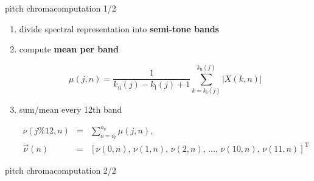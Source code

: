         \begin{frame}{pitch chroma}{computation 1/2}
            \begin{enumerate}
                \item	divide spectral representation into \textbf{semi-tone bands}
                \item<2->	compute \textbf{mean per band}
                    \begin{footnotesize}
                        \begin{equation*}
                            \mu(j,n)		= \frac{1}{k_{\mathrm{u}}(j)-k_{\mathrm{l}}(j)+1}\sum\limits_{k=k_{\mathrm{l}}(j)}^{k_{\mathrm{u}}(j)}{|X(k,n)|}
                        \end{equation*}
                    \end{footnotesize}
                \item<3->	sum/mean every 12th band
                    \begin{footnotesize}
                        \begin{eqnarray*}
                            \nu(j\% 12 ,n)		&=& \sum\limits_{o=o_l}^{o_u}{\mu(j,n)}\label{eq:pc}, \\
                            \vec{\nu}(n) 	&=& \left[\nu(0,n),\, \nu(1,n),\, \nu(2,n),\, \ldots,\, \nu(10,n),\, \nu(11,n)\right]^\mathrm{T} \nonumber
                        \end{eqnarray*}
                    \end{footnotesize}
            \end{enumerate}
        \end{frame}
        \begin{frame}{pitch chroma}{computation 2/2}
        \end{frame}
